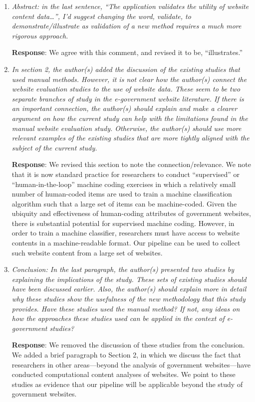 \documentclass[12pt,titlepage]{article}
\begin{document}
\begin{enumerate}


\item \emph{ Abstract: in the last sentence, “The application validates the utility of website content data…”, I’d suggest changing the word, validate, to demonstrate/illustrate as validation of a new method requires a much more rigorous approach. } 

	\textbf{Response}: We agree with this comment, and revised it to be, ``illustrates.''
	
	\item \emph{ In section 2, the author(s) added the discussion of the existing studies that used manual methods. However, it is not clear how the author(s) connect the website evaluation studies to the use of website data. These seem to be two separate branches of study in the e-government website literature. If there is an important connection, the author(s) should explain and make a clearer argument on how the current study can help with the limitations found in the manual website evaluation study. Otherwise, the author(s) should use more relevant examples of the existing studies that are more tightly aligned with the subject of the current study. } 

	\textbf{Response}:  We revised this section to note the connection/relevance. We note that it is now standard practice for researchers to conduct ``supervised'' or ``human-in-the-loop'' machine coding exercises in which a relatively small number of human-coded items are used to train a machine classification algorithm such that a large set of items can be machine-coded. Given the ubiquity and effectiveness of human-coding attributes of government websites, there is substantial potential for supervised machine coding. However, in order to train a machine classifier, researchers must have access to website contents in a machine-readable format. Our pipeline can be used to collect such website content from a large set of websites.
	
	\item \emph{ Conclusion: In the last paragraph, the author(s) presented two studies by explaining the implications of the study. These sets of existing studies should have been discussed earlier. Also, the author(s) should explain more in detail why these studies show the usefulness of the new methodology that this study provides. Have these studies used the manual method? If not, any ideas on how the approaches these studies used can be applied in the context of e-government studies? } 

	\textbf{Response}:  We removed the discussion of these studies from the conclusion. We added a brief paragraph to Section 2, in which we discuss the fact that researchers in other areas---beyond the analysis of government websites---have conducted computational content analyses of websites. We point to these studies as evidence that our pipeline will be applicable beyond the study of government websites.



\end{enumerate}



%
% 
\end{document}
